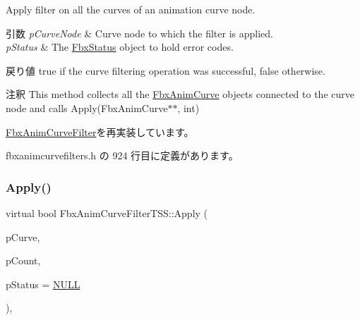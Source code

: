 Apply filter on all the curves of an animation curve node. 
\begin{DoxyParams}{引数}
{\em p\+Curve\+Node} & Curve node to which the filter is applied. \\
\hline
{\em p\+Status} & The \hyperlink{class_fbx_status}{Fbx\+Status} object to hold error codes. \\
\hline
\end{DoxyParams}
\begin{DoxyReturn}{戻り値}
{\ttfamily true} if the curve filtering operation was successful, {\ttfamily false} otherwise. 
\end{DoxyReturn}
\begin{DoxyRemark}{注釈}
This method collects all the \hyperlink{class_fbx_anim_curve}{Fbx\+Anim\+Curve} objects connected to the curve node and calls Apply(\+Fbx\+Anim\+Curve$\ast$$\ast$, int) 
\end{DoxyRemark}


\hyperlink{class_fbx_anim_curve_filter_ad042b45c0675278fa49e61739b0825c2}{Fbx\+Anim\+Curve\+Filter}を再実装しています。



 fbxanimcurvefilters.\+h の 924 行目に定義があります。

\mbox{\label{class_fbx_anim_curve_filter_t_s_s_a437251b0d7ead091c273ae49a3e21e5f}} 
\subsubsection{\texorpdfstring{Apply()}{Apply()}\hspace{0.1cm}{\footnotesize\ttfamily [4/5]}}
{\footnotesize\ttfamily virtual bool Fbx\+Anim\+Curve\+Filter\+T\+S\+S\+::\+Apply (\begin{DoxyParamCaption}\item[{\hyperlink{class_fbx_anim_curve}{Fbx\+Anim\+Curve} $\ast$$\ast$}]{p\+Curve,  }\item[{int}]{p\+Count,  }\item[{\hyperlink{class_fbx_status}{Fbx\+Status} $\ast$}]{p\+Status = {\ttfamily \hyperlink{fbxarch_8h_a070d2ce7b6bb7e5c05602aa8c308d0c4}{N\+U\+LL}} }\end{DoxyParamCaption})\hspace{0.3cm}{\ttfamily [inline]}, {\ttfamily [virtual]}}

